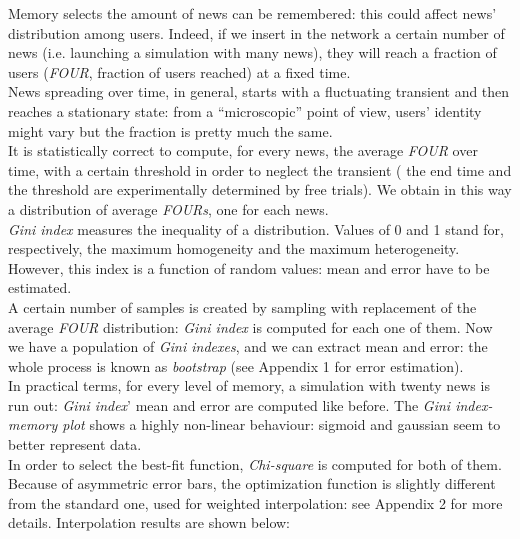 
Memory selects the amount of news can be remembered: this could affect news' distribution among users.
Indeed, if we insert in the network a certain number of news (i.e. launching a simulation with many news), they will reach a fraction of users (\textit{FOUR}, fraction of users reached) at a fixed time.\\
News spreading over time, in general, starts with a fluctuating transient and then reaches a stationary state: from a ``microscopic'' point of view, users' identity might vary but the fraction is pretty much the same. \\
It is statistically correct to compute, for every news, the average \textit{FOUR} over time, with a certain threshold in order to neglect the transient ( the end time and the threshold are experimentally determined by free trials).
We obtain in this  way a distribution of average \textit{FOURs}, one for each news.\\
\textit{Gini index} measures the inequality of a distribution. Values of 0 and 1 stand for, respectively, the maximum homogeneity and the maximum heterogeneity.
However, this index is a function of random values: mean and error have to be estimated.\\
A certain number of samples is created by sampling with replacement of the average \textit{FOUR} distribution: \textit{Gini index} is computed for each one of them.
Now we have a population of \textit{Gini indexes}, and we can extract mean and error: the whole process is known as \textit{bootstrap} (see Appendix 1 for error estimation).\\
In practical terms, for every level of  memory, a simulation with twenty news is run out: \textit{Gini index}' mean and error are computed like before.
The \textit{Gini index-memory plot} shows a highly non-linear behaviour: sigmoid and gaussian seem to better represent data.\\
 In order to select the best-fit function, \textit{Chi-square} is computed for both of them. \\
Because of asymmetric error bars, the optimization function is slightly different from the standard one, used for weighted interpolation: see Appendix 2 for more details.
Interpolation results are shown below:



